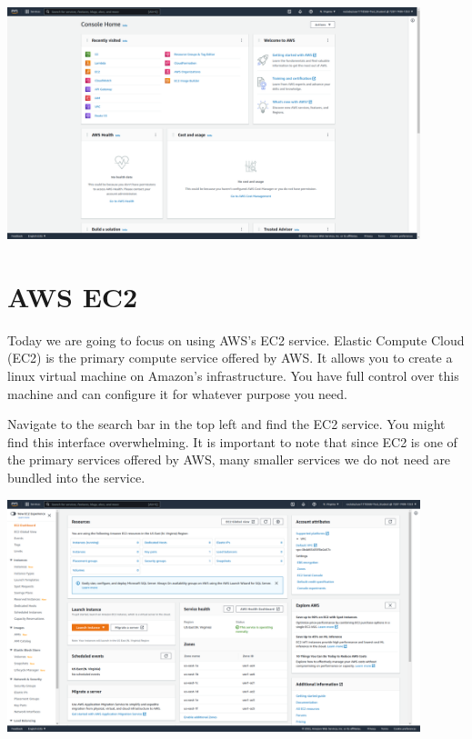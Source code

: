 \documentclass{csse4400}
\begin{document}
\begin{enumerate}
\includegraphics[width=0.9\textwidth]{images/aws-console}

\end{enumerate}


\section{AWS EC2}

Today we are going to focus on using AWS's EC2 service.
Elastic Compute Cloud (EC2) is the primary compute service offered by AWS.
It allows you to create a linux virtual machine on Amazon's infrastructure.
You have full control over this machine and can configure it for whatever purpose you need.

Navigate to the search bar in the top left and find the EC2 service.
You might find this interface overwhelming.
It is important to note that since EC2 is one of the primary services offered by AWS,
many smaller services we do not need are bundled into the service.


\vspace{3mm}
\includegraphics[width=0.9\textwidth]{images/ec2-interface}
\vspace{3mm}
\end{document}
